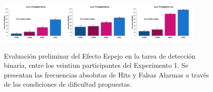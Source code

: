 \begin{figure}[th]
\includegraphics[width=0.30\textwidth]{Figures/MirrorRate_Exp2_P19} \includegraphics[width=0.30\textwidth]{Figures/MirrorRate_Exp2_P20} \includegraphics[width=0.30\textwidth]{Figures/MirrorRate_Exp2_P21} 
\caption[Hits y Falsas Alarmas entre condiciones; Experimento 2]{Evaluación preliminar del Efecto Espejo en la tarea de detección binaria, entre los veintiun participantes del Experimento 1. Se presentan las frecuencias absolutas de Hits y Falsas Alarmas a través de las condiciones de dificultad propuestas.}
\label{fig:MRate_E2}
\end{figure}

